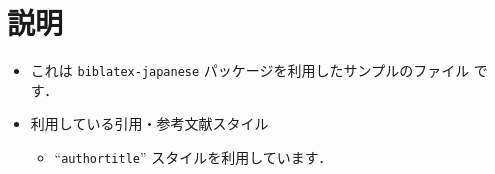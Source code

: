 \documentclass[10pt]{jlreq}
\begin{document}
\section{説明}

\begin{itemize}
 \item これは \texttt{biblatex-japanese} パッケージを利用したサンプルのファイル
       です．
 \item 利用している引用・参考文献スタイル
       \begin{itemize}
        \item ``\texttt{authortitle}'' スタイルを利用しています．
       \end{itemize}
\end{itemize}


\end{document}

